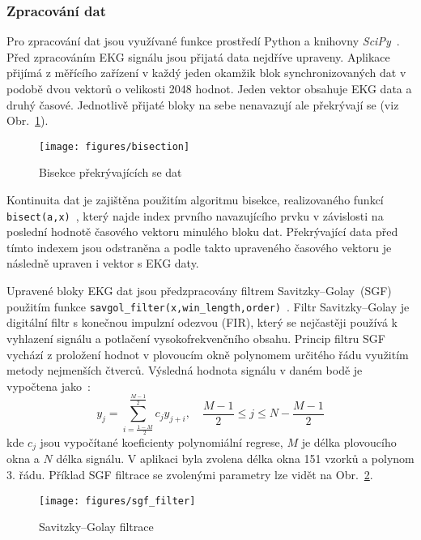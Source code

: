 \subsubsection{Zpracování dat}
\label{section:online_data_process}
Pro zpracování dat jsou využívané funkce prostředí Python a knihovny
\textit{SciPy}~\cite{SciPy2020}. Před zpracováním EKG signálu jsou přijatá data
nejdříve upraveny. Aplikace přijímá z měřícího zařízení v každý jeden okamžik
blok synchronizovaných dat v podobě dvou vektorů o velikosti 2048 hodnot. Jeden
vektor obsahuje EKG data a druhý časové. Jednotlivě přijaté bloky na sebe
nenavazují ale překrývají se (viz Obr.~\ref{fig:bisection}).
\begin{figure}[h]
    \begin{center}
        \texttt{[image: figures/bisection]}
        \caption{Bisekce překrývajících se dat}
        \label{fig:bisection}
    \end{center}
\end{figure}
Kontinuita dat je zajištěna použitím algoritmu bisekce, realizovaného funkcí
\texttt{bisect(a,x)}~\cite{bisectRight}, který najde index prvního navazujícího
prvku v závislosti na poslední hodnotě časového vektoru minulého bloku dat.
Překrývající data před tímto indexem jsou odstraněna a podle takto upraveného
časového vektoru je následně upraven i vektor s EKG daty.

Upravené bloky EKG dat jsou předzpracovány filtrem
Savitzky–Golay~(SGF)~\cite{Schafer2011} použitím funkce
\texttt{savgol{\_}filter(x,win{\_}length,order)}~\cite{scipySavgol}. Filtr
Savitzky–Golay je digitální filtr s konečnou impulzní odezvou (FIR), který se
nejčastěji používá k vyhlazení signálu a potlačení vysokofrekvenčního obsahu.
Princip filtru SGF vychází z proložení hodnot v plovoucím okně polynomem
určitého řádu využitím metody nejmenších čtverců. Výsledná hodnota signálu v
daném bodě je vypočtena jako~\cite{wikiSGF}:
\begin{equation}
    y_j = \sum_{i=\frac{1-M}{2}}^{\frac{M-1}{2}} c_j y_{j+i}, \quad \frac{M-1}{2} \leq j \leq N - \frac{M-1}{2}
\end{equation}
kde $c_j$ jsou vypočítané koeficienty polynomiální regrese, $M$ je délka
plovoucího okna a $N$ délka signálu. V aplikaci byla zvolena délka okna 151
vzorků a polynom 3. řádu. Příklad SGF filtrace se zvolenými parametry lze vidět
na Obr.~\ref{fig:sgf_filter}.

\begin{figure}[h]
    \begin{center}
        \texttt{[image: figures/sgf\_filter]}
        \caption{Savitzky–Golay filtrace}
        \label{fig:sgf_filter}
    \end{center}
\end{figure}

